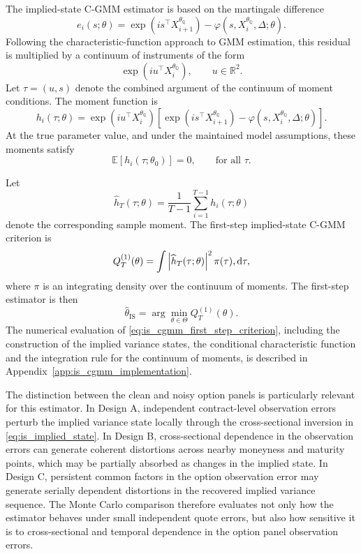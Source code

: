 \documentclass[11pt,a4paper,notitlepage]{article}
\numberwithin{equation}{section}
\begin{document}
The implied-state C-GMM estimator is based on the martingale difference
\[
e_i(s;\theta)
=
\exp\left(
is^\top X_{i+1}^{\theta_{\mathbb Q}}
\right)
-
\varphi\left(s,X_i^{\theta_{\mathbb Q}},\Delta;\theta\right).
\label{eq:is_cgmm_error}
\]
Following the characteristic-function approach to GMM estimation, this residual is multiplied by a continuum of instruments of the form
\[
\exp\left(
iu^\top X_i^{\theta_{\mathbb Q}}
\right),
\qquad u\in\mathbb R^2 .
\]
Let \(\tau=(u,s)\) denote the combined argument of the continuum of moment conditions. The moment function is
\[
h_i(\tau;\theta)
=
\exp\left(
iu^\top X_i^{\theta_{\mathbb Q}}
\right)
\left[
\exp\left(
is^\top X_{i+1}^{\theta_{\mathbb Q}}
\right)
-
\varphi\left(s,X_i^{\theta_{\mathbb Q}},\Delta;\theta\right)
\right].
\label{eq:is_cgmm_moment}
\]
At the true parameter value, and under the maintained model assumptions, these moments satisfy
\[
\mathbb E\left[
h_i(\tau;\theta_0)
\right]
=
0,
\qquad
\text{for all } \tau .
\]

Let
\[
\widehat h_T(\tau;\theta)
=
\frac{1}{T-1}
\sum_{i=1}^{T-1}
h_i(\tau;\theta)
\]
denote the corresponding sample moment. The first-step implied-state C-GMM criterion is
\[
Q_T^{(1)}(\theta)
=
\int
\left|
\widehat h_T(\tau;\theta)
\right|^2
\pi(\tau),\dif\tau ,
\label{eq:is_cgmm_first_step_criterion}
\]
where \(\pi\) is an integrating density over the continuum of moments. The first-step estimator is then
\begin{equation}
\widehat\theta_{\mathrm{IS}}
=
\arg\min_{\theta\in\Theta}
Q_T^{(1)}(\theta).
\label{eq:is_cgmm_estimator}
\end{equation}
The numerical evaluation of \eqref{eq:is_cgmm_first_step_criterion}, including the construction of the implied variance states, the conditional characteristic function and the integration rule for the continuum of moments, is described in Appendix~\ref{app:is_cgmm_implementation}.

The distinction between the clean and noisy option panels is particularly relevant for this estimator. In Design A, independent contract-level observation errors perturb the implied variance state locally through the cross-sectional inversion in \eqref{eq:is_implied_state}. In Design B, cross-sectional dependence in the observation errors can generate coherent distortions across nearby moneyness and maturity points, which may be partially absorbed as changes in the implied state. In Design C, persistent common factors in the option observation error may generate serially dependent distortions in the recovered implied variance sequence. The Monte Carlo comparison therefore evaluates not only how the estimator behaves under small independent quote errors, but also how sensitive it is to cross-sectional and temporal dependence in the option panel observation errors.
\end{document}
